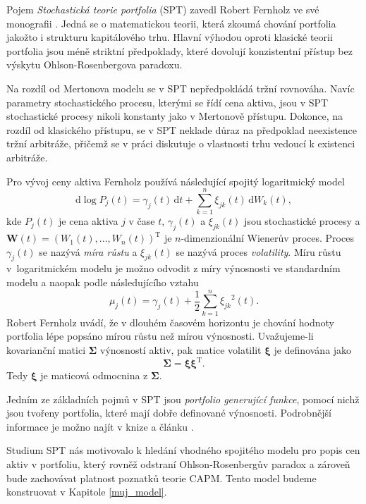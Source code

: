 \documentclass[a4paper,12pt]{report}
\theoremstyle{definition} \newtheorem{definice}[veta]{Definice}
\theoremstyle{remark}
\begin{document}
Pojem \textit{Stochastická teorie portfolia} (SPT) zavedl Robert Fernholz ve své monografii \cite{fern}.
Jedná se o matematickou teorii, která zkoumá chování portfolia jakožto i strukturu kapitálového trhu.
Hlavní výhodou oproti klasické teorii portfolia jsou méně  striktní předpoklady, které dovolují konzistentní přístup bez výskytu Ohlson-Rosenbergova paradoxu.

Na rozdíl od Mertonova modelu se v SPT nepředpokládá tržní rovnováha.
Navíc parametry stochastického procesu, kterými se řídí cena aktiva, jsou v SPT stochastické procesy nikoli konstanty jako v Mertonově přístupu.
Dokonce, na rozdíl od klasického přístupu, se v SPT neklade důraz na předpoklad neexistence tržní arbitráže, přičemž se v práci diskutuje o vlastnosti trhu vedoucí k existenci arbitráže. 

Pro vývoj ceny aktiva Fernholz používá následující spojitý logaritmický model
$$\mathrm{d}\log P_j(t)=\gamma_j(t)\,\mathrm{d}t+\sum_{k=1}^{n}\xi_{jk}(t)\,\mathrm{d}W_k(t),$$
kde $P_j(t)$ je cena aktiva $j$ v čase $t$, $\gamma_j(t)$ a $\xi_{jk}(t)$ jsou stochastické procesy a $\boldsymbol{W}(t)=(W_1(t),\dots,W_n(t))^\mathrm{T}$ je $n$-dimenzionální Wienerův proces. 
Proces $\gamma_j(t)$ se nazývá \textit{míra růstu} a $\xi_{jk}(t)$ se nazývá proces \textit{volatility}.
Míru růstu v~logaritmickém modelu je možno odvodit z míry výnosnosti ve standardním modelu a naopak podle následujícího vztahu
$$\mu_j(t)=\gamma_j(t)+\frac12\sum_{k=1}^{n}{\xi_{jk}}^2(t).$$
Robert Fernholz uvádí, že v dlouhém časovém horizontu je chování hodnoty portfolia lépe popsáno mírou růstu než mírou výnosnosti.
Uvažujeme-li kovarianční matici $\boldsymbol{\Sigma}$ výnosností aktiv, pak matice volatilit $\boldsymbol{\xi}$ je definována jako
$$\boldsymbol{\Sigma}=\boldsymbol{\xi}\boldsymbol{\xi}^\mathrm{T}.$$
Tedy $\boldsymbol{\xi}$ je maticová odmocnina z $\boldsymbol{\Sigma}$.

Jedním ze základních pojmů v SPT jsou \textit{portfolio generující funkce}, pomocí nichž jsou tvořeny portfolia, které mají dobře definované výnosnosti. 
Podrobnější informace je možno najít v knize \cite{fern} a článku \cite{kara}.

Studium SPT nás motivovalo k hledání vhodného spojitého modelu pro popis cen aktiv v portfoliu, který rovněž odstraní Ohlson-Rosenbergův paradox a zároveň bude zachovávat platnost poznatků teorie CAPM.
Tento model budeme konstruovat v Kapitole \ref{muj_model}.


\end{document}
